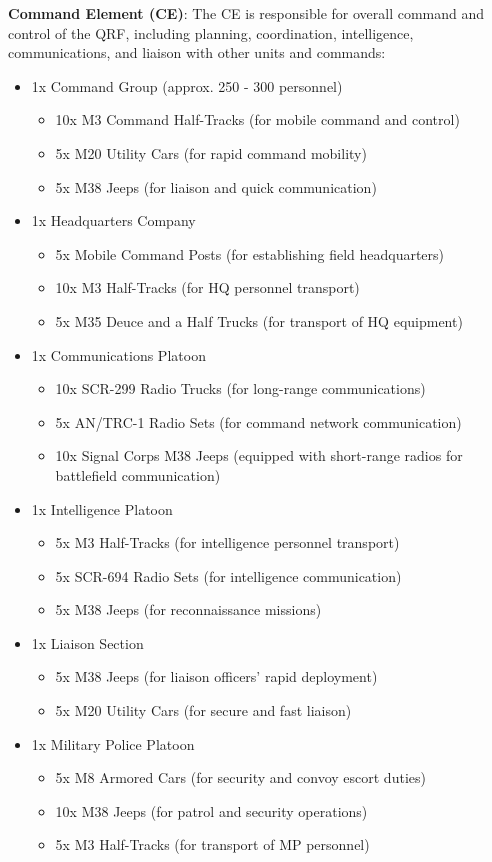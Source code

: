 \documentclass[a4paper,12pt]{article}
\begin{document}
{	\textbf{Command Element (CE)}: The CE is responsible for overall command and control of the QRF, including planning, coordination, intelligence, communications, and liaison with other units and commands:
	\begin{itemize}
		\item 1x Command Group (approx. 250 - 300 personnel)
		\begin{itemize}
			\item 10x M3 Command Half-Tracks (for mobile command and control)
			\item 5x M20 Utility Cars (for rapid command mobility)
			\item 5x M38 Jeeps (for liaison and quick communication)
		\end{itemize}
		\item 1x Headquarters Company
		\begin{itemize}
			\item 5x Mobile Command Posts (for establishing field headquarters)
			\item 10x M3 Half-Tracks (for HQ personnel transport)
			\item 5x M35 Deuce and a Half Trucks (for transport of HQ equipment)
		\end{itemize}
		\item 1x Communications Platoon
		\begin{itemize}
			\item 10x SCR-299 Radio Trucks (for long-range communications)
			\item 5x AN/TRC-1 Radio Sets (for command network communication)
			\item 10x Signal Corps M38 Jeeps (equipped with short-range radios for battlefield communication)
		\end{itemize}
		\item 1x Intelligence Platoon
		\begin{itemize}
			\item 5x M3 Half-Tracks (for intelligence personnel transport)
			\item 5x SCR-694 Radio Sets (for intelligence communication)
			\item 5x M38 Jeeps (for reconnaissance missions)
		\end{itemize}
		\item 1x Liaison Section
		\begin{itemize}
			\item 5x M38 Jeeps (for liaison officers' rapid deployment)
			\item 5x M20 Utility Cars (for secure and fast liaison)
		\end{itemize}
		\item 1x Military Police Platoon
		\begin{itemize}
			\item 5x M8 Armored Cars (for security and convoy escort duties)
			\item 10x M38 Jeeps (for patrol and security operations)
			\item 5x M3 Half-Tracks (for transport of MP personnel)
		\end{itemize}
	\end{itemize}	
}

\clearpage

\printbibliography
\end{document}
